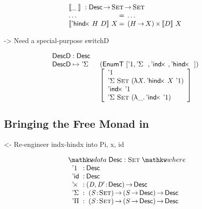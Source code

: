 \documentclass[preprint, authoryear]{sigplanconf}
\newenvironment{structure}{\footnotesize\verbatim}{\endverbatim}
\begin{document}
\[\stk{
\descop{\_\:}{} : \Desc \To \Set \To \Set \\
\begin{array}{@{}l@{\:=\:\:}ll}
\ldots                        &  \ldots \\
\descop{\DHindx{H}{D}}{X}     &  \TIMES{(H \To X)}{\descop{D}{X}}
\end{array}
}\]

\begin{structure}
    -> Need a special-purpose switchD
\end{structure}


\[\stk{
\DescD : \Desc \\
\begin{array}{@{}ll}
\DescD \mapsto \DSigma{}{} & (\EnumT [ \DUnit, \DSigma{}{}, \DIndx{}, \DHindx{}{} ]) \\
                           & \left[\begin{array}{l}
                                   \DUnit                                \\
                                   \DSigma{\Set}{(\LAM{\V{X}} \DHindx{X}{\DUnit})} \\
                                   \DIndx{\DUnit}                                  \\
                                   \DSigma{\Set}{(\LAM{\_} \DIndx{\DUnit})}
                                   \end{array}
                             \right]
\end{array}
}
\]

\subsection{Bringing the Free Monad in}

\begin{structure}
<- Re-engineer indx-hindx into Pi, x, id
\end{structure}

\[
\stk{
\data \Desc : \Set \where \\
\;\;\begin{array}{@{}l@{\::\:}l@{\quad}l}
    \DUnit          & \Desc                                   \\
    \DId            & \Desc                                   \\
    \DProd{}{}      & \PI{\V{D}, \V{D'}}{\Desc} \Desc         \\
    \DSigma         & \PI{\V{S}}{\Set} \PIS{S \To \Desc} \Desc \\
    \DPi            & \PI{\V{S}}{\Set} \PIS{S \To \Desc} \Desc 
\end{array}
}
\]
\end{document}
